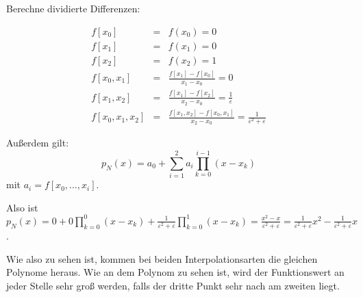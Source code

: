 \documentclass[11pt,a4paper,ngerman]{article}
\begin{document}
Berechne dividierte Differenzen:

\begin{eqnarray*}
f[x_0] &=& f(x_0) = 0 \\
f[x_1] &=& f(x_1) = 0 \\
f[x_2] &=& f(x_2) = 1 \\
f[x_0,x_1] &=& \frac{f[x_1] - f[x_0]}{x_1 - x_0} = 0 \\
f[x_1,x_2] &=& \frac{f[x_1] - f[x_2]}{x_2 - x_0} = \frac{1}{\varepsilon} \\
f[x_0,x_1,x_2] &=& \frac{f[x_1,x_2] - f[x_0,x_1]}{x_2 - x_0} = \frac{1}{\varepsilon^2 + \varepsilon}
\end{eqnarray*}

Außerdem gilt:
$$ p_N(x) = a_0 + \sum_{i=1}^{2}{a_i \prod_{k=0}^{i-1}{(x-x_k)}} $$
mit $a_i = f[x_0,...,x_i]$.

Also ist 
$p_N(x) = 0 + 0 \prod_{k=0}^{0}{(x-x_k)} + \frac{1}{\varepsilon^2 + \varepsilon} \prod_{k=0}^{1}{(x-x_k)} = \frac{x^2-x}{\varepsilon^2 + \varepsilon}  = \frac{1}{\varepsilon^2 + \varepsilon}x^2 - \frac{1}{\varepsilon^2 + \varepsilon}x$.

Wie also zu sehen ist, kommen bei beiden Interpolationsarten die gleichen Polynome heraus. Wie an dem Polynom zu sehen ist, wird der Funktionswert an jeder Stelle sehr groß werden, falls der dritte Punkt sehr nach am zweiten liegt.
\label{LastPage}
\end{document}
